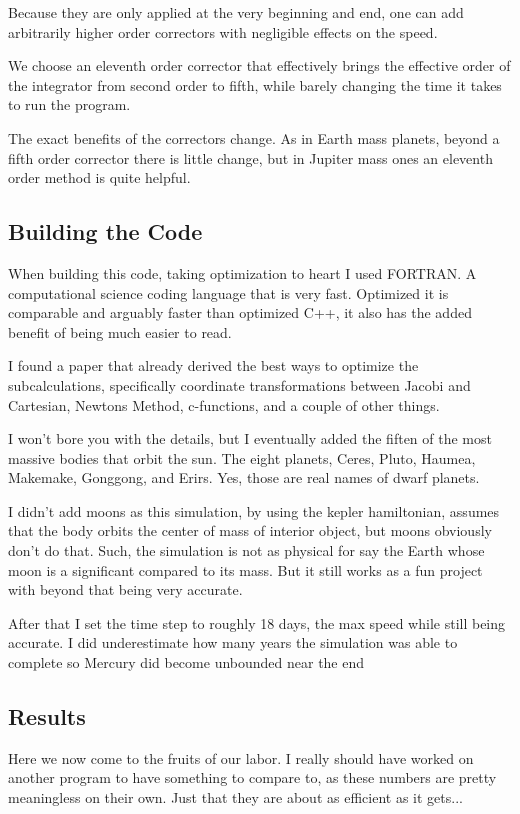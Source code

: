 Because they are only applied at the very beginning and end, one can add arbitrarily higher order correctors with negligible effects on the speed.

We choose an eleventh order corrector that effectively brings the effective order of the integrator from second order to fifth, while barely changing the time it takes to run the program.

The exact benefits of the correctors change. As in Earth mass planets, beyond a fifth order corrector there is little change, but in Jupiter mass ones an eleventh order method is quite helpful.


\subsection{Building the Code}

When building this code, taking optimization to heart I used FORTRAN. A computational science coding language that is very fast. Optimized it is comparable and arguably faster than optimized C++, it also has the added benefit of being much easier to read.

I found a paper that already derived the best ways to optimize the subcalculations, specifically coordinate transformations between Jacobi and Cartesian, Newtons Method, c-functions, and a couple of other things.

I won't bore you with the details, but I eventually added the fiften of the most massive bodies that orbit the sun. The eight planets, Ceres, Pluto, Haumea, Makemake, Gonggong, and Erirs. Yes, those are real names of dwarf planets.

I didn't add moons as this simulation, by using the kepler hamiltonian, assumes that the body orbits the center of mass of interior object, but moons obviously don't do that. Such, the simulation is not as physical for say the Earth whose moon is a significant compared to its mass. But it still works as a fun project with beyond that being very accurate.

After that I set the time step to roughly 18 days, the max speed while still being accurate. I did underestimate how many years the simulation was able to complete so Mercury did become unbounded near the end

\subsection{Results}

Here we now come to the fruits of our labor. I really should have worked on another program to have something to compare to, as these numbers are pretty meaningless on their own. Just that they are about as efficient as it gets...

